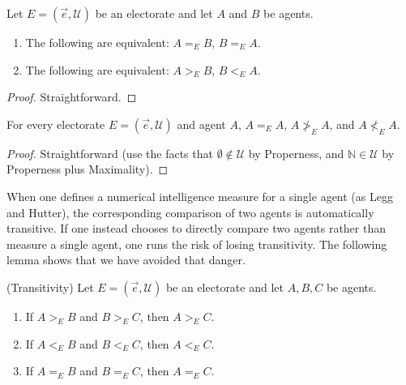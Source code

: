 \documentclass[twoside,11pt]{article}
\begin{document}
\begin{lemma}
    Let $E=(\vec{e},\mathscr U)$ be an electorate and let $A$ and $B$ be agents.
    \begin{enumerate}
        \item The following are equivalent: $A=_{E}B$, $B=_{E}A$.
        \item The following are equivalent: $A>_{E}B$, $B<_{E}A$.
    \end{enumerate}
\end{lemma}

\begin{proof}
Straightforward.
\end{proof}

\begin{lemma}
    For every electorate $E=(\vec{e},\mathscr U)$ and agent $A$,
    $A=_{E}A$, $A\not>_{E}A$, and $A\not<_{E}A$.
\end{lemma}

\begin{proof}
    Straightforward (use the facts that $\emptyset\not\in\mathscr U$ by Properness,
    and $\mathbb N\in\mathscr U$ by Properness plus Maximality).
\end{proof}

When one defines a numerical intelligence measure for a single agent (as Legg and Hutter),
the corresponding comparison of two agents is automatically transitive.
If one instead chooses to directly compare two agents rather than measure a single agent,
one runs the risk of losing transitivity. The following lemma shows that we have
avoided that danger.


\begin{lemma}
\label{transitivityLemma}
    (Transitivity)
    Let $E=(\vec{e},\mathscr U)$ be an electorate and let $A,B,C$ be agents.
    \begin{enumerate}
        \item If $A>_{E}B$ and $B>_{E}C$, then $A>_{E}C$.
        \item If $A<_{E}B$ and $B<_{E}C$, then $A<_{E}C$.
        \item If $A=_{E}B$ and $B=_{E}C$, then $A=_{E}C$.
    \end{enumerate}
\end{lemma}
\end{document}
